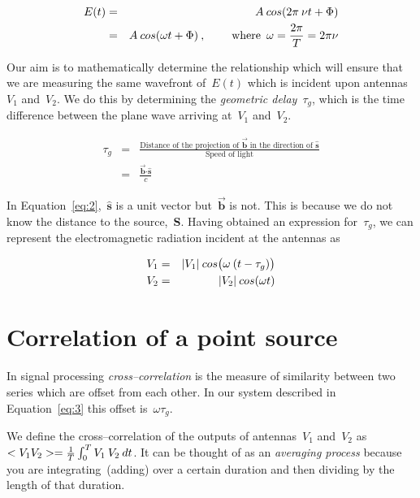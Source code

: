 \documentclass[11pt, a4paper]{article}
\newcommand{\msp}{\mkern \medmuskip}
\begin{document}
\begin{eqnarray}
  \label{eq:1}
  E(t) &=& A \msp cos(2\pi \msp \nu t + \Phi) \nonumber \\
       &=& A \msp cos(\omega t + \Phi) \msp , \hspace{0.8cm} \mbox{where} \enspace \omega = \frac{2\pi}{T} = 2\pi \nu
\end{eqnarray}

Our aim is to mathematically determine the relationship which will ensure that we are measuring the same wavefront of~$E(t)$ which is incident upon antennas~$V_1$ and~$V_2$. We do this by determining the \emph{geometric delay}~$\tau _g$, which is the time difference between the plane wave arriving at~$V_1$ and~$V_2$.

\begin{eqnarray}
  \label{eq:2}
  \tau _g &=& \frac{\mbox{Distance of the projection of $\vec{\mathbf{b}}$ in the direction of $\mathbf{\hat{s}}$}}{\mbox{Speed of light}} \nonumber \\
          &=& \frac{\vec{\mathbf{b}} \boldsymbol{\cdot} \mathbf{\hat{s}}}{c}
\end{eqnarray}

In Equation~\eqref{eq:2},~$\mathbf{\hat{s}}$ is a unit vector but~$\vec{\mathbf{b}}$ is not. This is because we do not know the distance to the source,~\textbf{S}. Having obtained an expression for~$\tau _g$, we can represent the electromagnetic radiation incident at the antennas as

\begin{eqnarray}
  \label{eq:3}
  \begin{aligned}
  V_1 &=& |V_1| \msp cos\big (\omega \msp (t - \tau _g)\big ) \\
  V_2 &=& |V_2| \msp cos(\omega t)
  \end{aligned}
\end{eqnarray}

\section{Correlation of a point source}
In signal processing \emph{cross--correlation} is the measure of similarity between two series which are offset from each other. In our system described in Equation~\eqref{eq:3} this offset is~$\omega \tau _g$.

We define the cross--correlation of the outputs of antennas~$V_1$ and~$V_2$ as~$<V_1V_2> = \frac{1}{T} \int _0^T V_1 \msp V_2 \msp dt$. It can be thought of as an \emph{averaging process} because you are integrating~(adding) over a certain duration and then dividing by the length of that duration.
\end{document}
